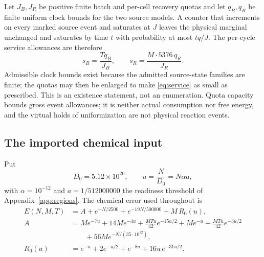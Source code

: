 \documentclass[11pt,a4paper]{article}
\theoremstyle{plain}
\theoremstyle{definition}
\theoremstyle{remark}
\begin{document}
Let $J_B,J_R$ be positive finite batch and per-cell recovery quotas and let
$q_B,q_R$ be finite uniform clock bounds for the two source models. A counter
that increments on every marked source event and saturates at $J$ leaves the
physical marginal unchanged and saturates by time $t$ with probability at most
$tq/J$. The per-cycle service allowances are therefore
\begin{equation}\label{eq:service}
s_B=\frac{Tq_B}{J_B},\qquad s_R=\frac{M\cdot5376\,q_R}{J_R}.
\end{equation}
Admissible clock bounds exist because the admitted source-state families are
finite; the quotas may then be enlarged to make \eqref{eq:service} as small as
prescribed. This is an existence statement, not an enumeration. Quota capacity
bounds gross event allowances; it is neither actual consumption nor free
energy, and the virtual holds of uniformization are not physical reaction
events.

\subsection{The imported chemical input}\label{sec:input}

Put
\begin{equation}\label{eq:D0}
D_0=5.12\times10^{20},\qquad u=\frac{N}{D_0}=N\alpha a,
\end{equation}
with $\alpha=10^{-12}$ and $a=1/512000000$ the readiness threshold of
Appendix~\ref{app:regions}. The chemical error used throughout is
\begin{align}
E(N,M,T)&=A+e^{-N/2500}+e^{-19N/500000}+M\,R_0(u),\label{eq:E}\\
A&=Me^{-7u}+14Me^{-4u}+\frac{MTu}{42}e^{-15u/2}
 +Me^{-u}+\frac{MTu}{42}e^{-3u/2}\nonumber\\
 &\qquad{}+56Me^{-N/(35\cdot10^{12})},\nonumber\\
R_0(u)&=e^{-u}+2e^{-u/2}+e^{-8u}+16u\,e^{-31u/2}.\nonumber
\end{align}
\end{document}
